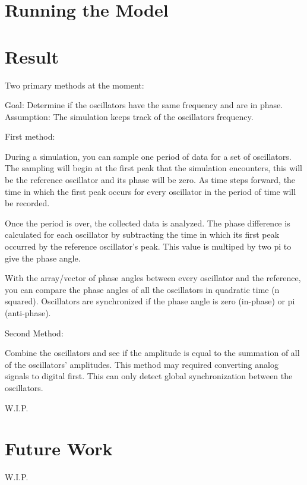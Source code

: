 \documentclass{article}
\begin{document}
\section{Running the Model}

\section{Result} %

Two primary methods at the moment:

Goal: Determine if the oscillators have the same frequency and are in phase.
Assumption: The simulation keeps track of the oscillators frequency.\newline

\noindent First method:

During a simulation, you can sample one period of data for a set of oscillators. The sampling will begin at the first peak that the simulation encounters, this will be the reference oscillator and its phase will be zero. As time steps forward, the time in which the first peak occurs for every oscillator in the period of time will be recorded. 

Once the period is over, the collected data is analyzed. The phase difference is calculated for each oscillator by subtracting the time in which its first peak occurred by the reference oscillator's peak. This value is multiped by two pi to give the phase angle.

With the array/vector of phase angles between every oscillator and the reference, you can compare the phase angles of all the oscillators in quadratic time (n squared). Oscillators are synchronized if the phase angle is zero (in-phase) or pi (anti-phase).\newline

\noindent Second Method:

Combine the oscillators and see if the amplitude is equal to the summation of all of the oscillators' amplitudes. This method may required converting analog signals to digital first. This can only detect global synchronization between the oscillators.

W.I.P.
	

													
\section{Future Work}
W.I.P.



\end{document}
